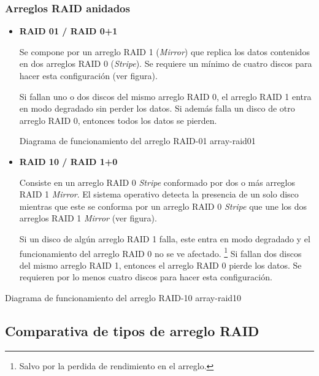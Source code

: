 \subsubsection*{Arreglos RAID anidados}

\begin{itemize}

  \item \textbf{RAID 01 / RAID 0+1}

Se compone por un arreglo \textsc{\gls{RAID}} 1 (\textit{Mirror}) que replica los datos contenidos en dos arreglos \textsc{\gls{RAID}} 0 (\textit{Stripe}). Se requiere un m\'{i}nimo de cuatro discos para hacer esta configuraci\'{o}n (ver figura).

Si fallan uno o dos discos del mismo arreglo \textsc{\gls{RAID}} 0, el arreglo \textsc{\gls{RAID}} 1 entra en modo degradado sin perder los datos. Si adem\'{a}s falla un disco de otro arreglo \textsc{\gls{RAID}} 0, entonces todos los datos se pierden.

\diagramblock
{Diagrama de funcionamiento del arreglo \textsc{RAID-01}}
{array-raid01}
{
 {
  
 }
}

\newpage
  \item \textbf{RAID 10 / RAID 1+0}

Consiste en un arreglo \textsc{\gls{RAID}} 0 \textit{Stripe} conformado por dos o m\'{a}s arreglos \textsc{\gls{RAID}} 1 \textit{Mirror}. El sistema operativo detecta la presencia de un solo disco mientras que este se conforma por un arreglo \textsc{\gls{RAID}} 0 \textit{Stripe} que une los dos arreglos \textsc{\gls{RAID}} 1 \textit{Mirror} (ver figura).

Si un disco de alg\'{u}n arreglo \textsc{\gls{RAID}} 1 falla, este entra en modo degradado y el funcionamiento del arreglo \textsc{\gls{RAID}} 0 no se ve afectado. \footnote{Salvo por la perdida de rendimiento en el arreglo.} Si fallan dos discos del mismo arreglo \textsc{\gls{RAID}} 1, entonces el arreglo \textsc{\gls{RAID}} 0 pierde los datos. Se requieren por lo menos cuatro discos para hacer esta configuraci\'{o}n.

\end{itemize}

\diagramblock
{Diagrama de funcionamiento del arreglo \textsc{RAID-10}}
{array-raid10}
{
 {
  
 }
}

\newpage
      \subsection {Comparativa de tipos de arreglo RAID}

